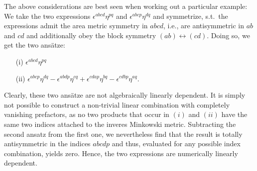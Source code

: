 The above considerations are best seen when working out a particular example: We take the two expressions $\epsilon^{abcd} \eta^{pq}$ and $\epsilon^{abcp} \eta^{dq}$ and symmetrize, s.t.\ the expressions admit the area metric symmetry in $abcd$, i.e., are antisymmetric in $ab$ and $cd$ and additionally obey the block symmetry $(ab) \leftrightarrow (cd)$. Doing so, we get the two ansätze: 
\begin{itemize}
\item[(i)] $\epsilon^{abcd} \eta^{pq}$ 
\item[(ii)] $\epsilon^{abcp} \eta^{dq} - \epsilon^{abdp} \eta^{cq} + \epsilon^{cdap} \eta^{bq} - \epsilon^{cdbp} \eta^{aq}$.
\end{itemize}
Clearly, these two ansätze are not algebraically linearly dependent. It is simply not possible to construct a non-trivial linear combination with completely vanishing prefactors, as no two products that occur in $(i)$ and $(ii)$ have the same two indices attached to the inveres Minkowski metric.  Subtracting the second ansatz from the first one, we nevertheless find that the result is totally antisymmetric in the indices $abcdp$ and thus, evaluated for any possible index combination, yields zero. Hence, the two expressions are numerically linearly dependent.

